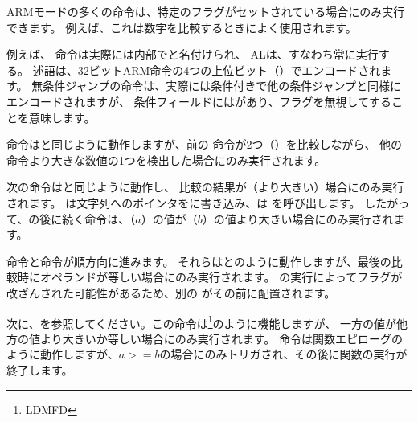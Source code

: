\label{subsec:jcc_ARM}

\mysubparagraph{\OptimizingKeilVI (\ARMMode)}




ARMモードの多くの命令は、特定のフラグがセットされている場合にのみ実行できます。
例えば、これは数字を比較するときによく使用されます。


例えば、 \ADD 命令は実際には内部でと名付けられ、
ALは、すなわち常に実行する。
述語は、32ビットARM命令の4つの上位ビット（）でエンコードされます。
無条件ジャンプの命令は、実際には条件付きで他の条件ジャンプと同様にエンコードされますが、
条件フィールドにはがあり、フラグを無視してすることを意味します。


命令はと同じように動作しますが、前の \CMP 命令が2つ（）を比較しながら、
他の命令より大きな数値の1つを検出した場合にのみ実行されます。


次の命令はと同じように動作し、
比較の結果が（より大きい）場合にのみ実行されます。 
は文字列へのポインタをに書き込み、は \printf を呼び出します。
したがって、の後に続く命令は、（$a$）の値が（$b$）の値より大きい場合にのみ実行されます。


命令と命令が順方向に進みます。
それらはとのように動作しますが、最後の比較時にオペランドが等しい場合にのみ実行されます。 
\printf の実行によってフラグが改ざんされた可能性があるため、別の \CMP がその前に配置されます。


次に、を参照してください。この命令は\footnote{\ac{LDMFD}}のように機能しますが、
一方の値が他方の値より大きいか等しい場合にのみ実行されます。 
命令は関数エピローグのように動作しますが、$a>=b$の場合にのみトリガされ、その後に関数の実行が終了します。

